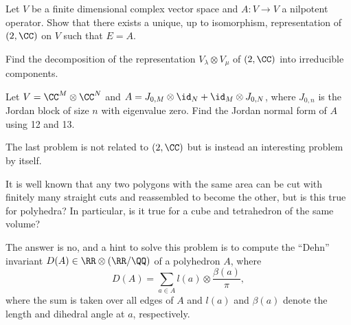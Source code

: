 \documentclass{article}
\begin{document}
\begin{prb}
Let $V$ be a finite dimensional complex vector space and $A : V \to V$ a
nilpotent operator. Show that there exists a unique, up to isomorphism,
representation of $\sl(2, \CC)$ on $V$ such that $E = A$.
\end{prb}

\begin{prb}
Find the decomposition of the representation $V_{\lambda} \otimes V_{\mu}$ of
$\sl(2, \CC)$ into irreducible components.
\end{prb}

\begin{prb}
Let $V = \CC^M \otimes \CC^N$ and $A = J_{0, M} \otimes \id_N + \id_M \otimes
J_{0, N}$, where $J_{0, n}$ is the Jordan block of size $n$ with eigenvalue
zero. Find the Jordan normal form of $A$ using 12 and 13.
\end{prb}

The last problem is not related to $\sl(2, \CC)$ but is instead an interesting
problem by itself.

\begin{prb}
It is well known that any two polygons with the same area can be cut with
finitely many straight cuts and reassembled to become the other, but is this
true for polyhedra? In particular, is it true for a cube and tetrahedron of the
same volume?

The answer is no, and a hint to solve this problem is to compute the ``Dehn''
invariant $D(A) \in \RR \otimes (\RR / \QQ)$ of a polyhedron $A$, where
\[ D(A) = \sum_{a \in A} l(a) \otimes \frac{\beta(a)}{\pi}, \]
where the sum is taken over all edges of $A$ and $l(a)$ and $\beta(a)$ denote
the length and dihedral angle at $a$, respectively.
\end{prb}
\end{document}
